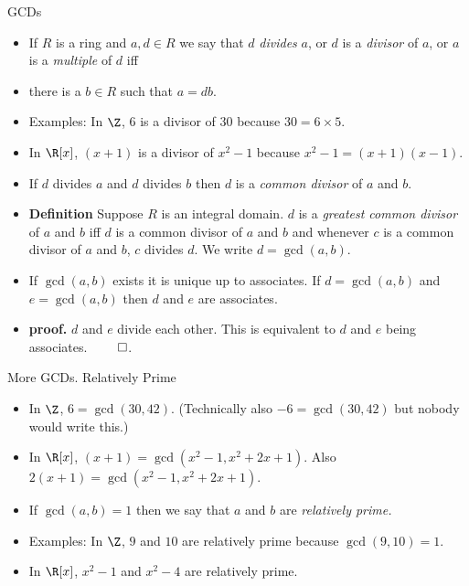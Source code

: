 \documentclass{beamer}
\begin{document}
\begin{frame}{GCDs}

\begin{itemize}
  \item If $R$ is a ring and $a,d\in R$ we say that $d$ \emph{divides} $a$, or $d$ is a \emph{divisor} of $a$, or $a$ is a \emph{multiple} of $d$ iff
  \item there is a $b\in R$ such that $a=db$.
  \item Examples: In $\Z$, $6$ is a divisor of $30$ because $30 = 6\times 5$.
  \item In $\R[x]$, $(x+1)$ is a divisor of $x^2-1$ because $x^2-1 = (x+1)(x-1)$.
  \item If $d$ divides $a$ and $d$ divides $b$ then $d$ is a \emph{common divisor} of $a$ and $b$.
  \item \textbf{Definition} Suppose $R$ is an integral domain. $d$ is a \emph{greatest common divisor} of $a$ and $b$ iff $d$ is a
  common divisor of $a$ and $b$ and whenever $c$ is a common divisor of $a$ and $b$, $c$ divides $d$.
  We write $d=\gcd(a,b)$.
  \item If $\gcd(a,b)$ exists it is unique up to associates. If $d=\gcd(a,b)$ and $e=\gcd(a,b)$ then $d$ and $e$ are associates.
  \item \textbf{proof.} $d$ and $e$ divide each other. This is equivalent to $d$ and $e$ being associates. $\qed$.
\end{itemize}

\end{frame}


\begin{frame}{More GCDs. Relatively Prime}

\begin{itemize}
  \item In $\Z$, $6 = \gcd(30, 42)$. (Technically also $-6=\gcd(30,42)$ but nobody would write this.)
  \item In $\R[x]$, $(x+1) = \gcd(x^2-1, x^2+2x+1)$. Also $2(x+1)= \gcd(x^2-1, x^2+2x+1)$.
  \item If $\gcd(a,b) = 1$ then we say that $a$ and $b$ are \emph{relatively prime.}
  \item Examples: In $\Z$, $9$ and $10$ are relatively prime because $\gcd(9,10) = 1$.
  \item In $\R[x]$, $x^2-1$ and $x^2 -4$ are relatively prime.
\end{itemize}

\end{frame}
\end{document}

